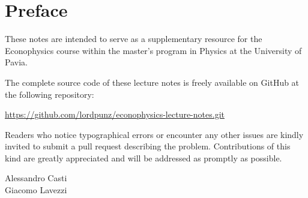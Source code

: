 \chapter*{Preface}

These notes are intended to serve as a supplementary resource for the 
Econophysics course within the master’s program in Physics at the 
University of Pavia.

The complete source code of these lecture notes is freely available on 
GitHub at the following repository:

\begin{center}
    \url{https://github.com/lordpunz/econophysics-lecture-notes.git}
\end{center}

\vspace{\baselineskip}
Readers who notice typographical errors or encounter any other issues 
are kindly invited to submit a pull request describing the problem. 
Contributions of this kind are greatly appreciated and will be addressed 
as promptly as possible.

\bigskip
\hfill Alessandro Casti \\
\hfill Giacomo Lavezzi
